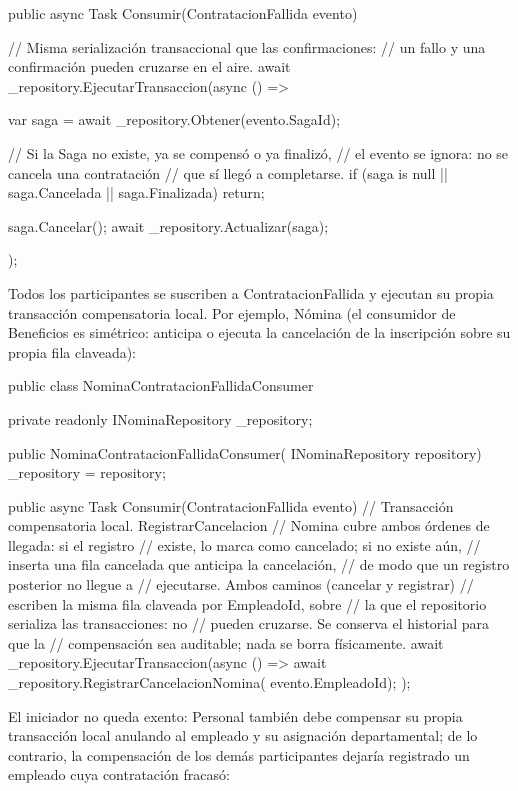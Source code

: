 \documentclass[12pt, a4paper]{article}
\begin{document}
    \begin{csharpbox}
public async Task Consumir(ContratacionFallida evento)
{
    // Misma serialización transaccional que las confirmaciones:
    // un fallo y una confirmación pueden cruzarse en el aire.
    await _repository.EjecutarTransaccion(async () =>
    {
        var saga = await _repository.Obtener(evento.SagaId);

        // Si la Saga no existe, ya se compensó o ya finalizó,
        // el evento se ignora: no se cancela una contratación
        // que sí llegó a completarse.
        if (saga is null || saga.Cancelada || saga.Finalizada)
            return;

        saga.Cancelar();
        await _repository.Actualizar(saga);
    });
}
    \end{csharpbox}

    Todos los participantes se suscriben a ContratacionFallida y ejecutan su propia transacción compensatoria local. Por ejemplo, Nómina (el consumidor de Beneficios es simétrico: anticipa o ejecuta la cancelación de la inscripción sobre su propia fila claveada):

    \begin{csharpbox}
public class NominaContratacionFallidaConsumer
{
    private readonly INominaRepository _repository;

    public NominaContratacionFallidaConsumer(
        INominaRepository repository)
    {
        _repository = repository;
    }

    public async Task Consumir(ContratacionFallida evento)
    {
        // Transacción compensatoria local. RegistrarCancelacion
        // Nomina cubre ambos órdenes de llegada: si el registro
        // existe, lo marca como cancelado; si no existe aún,
        // inserta una fila cancelada que anticipa la cancelación,
        // de modo que un registro posterior no llegue a
        // ejecutarse. Ambos caminos (cancelar y registrar)
        // escriben la misma fila claveada por EmpleadoId, sobre
        // la que el repositorio serializa las transacciones: no
        // pueden cruzarse. Se conserva el historial para que la
        // compensación sea auditable; nada se borra físicamente.
        await _repository.EjecutarTransaccion(async () =>
        {
            await _repository.RegistrarCancelacionNomina(
                evento.EmpleadoId);
        });
    }
}
    \end{csharpbox}

    El iniciador no queda exento: Personal también debe compensar su propia transacción local anulando al empleado y su asignación departamental; de lo contrario, la compensación de los demás participantes dejaría registrado un empleado cuya contratación fracasó:
\end{document}
